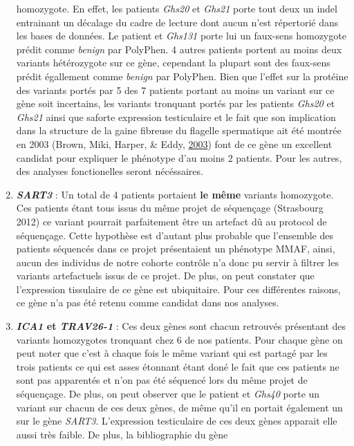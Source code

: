 \documentclass[12pt,twoside]{reedthesis}
\theoremstyle{definition}
\theoremstyle{definition}
\theoremstyle{remark}
\begin{document}
\begin{enumerate}
    homozygote. En effet, les patients \emph{Ghs20} et \emph{Ghs21} porte
    tout deux un indel entrainant un décalage du cadre de lecture dont
    aucun n'est répertorié dans les bases de données. Le patient et
    \emph{Ghs131} porte lui un faux-sens homozygote prédit comme
    \emph{benign} par PolyPhen. 4 autres patients portent au moins deux
    variants hétérozygote sur ce gène, cependant la plupart sont des
    faux-sens prédit égallement comme \emph{benign} par PolyPhen. Bien que
    l'effet sur la protéine des variants portés par 5 des 7 patients
    portant au moins un variant sur ce gène soit incertains, les variants
    tronquant portés par les patients \emph{Ghs20} et \emph{Ghs21} ainsi
    que saforte expression testiculaire et le fait que son implication
    dans la structure de la gaine fibreuse du flagelle spermatique ait été
    montrée en 2003 (Brown, Miki, Harper, \& Eddy,
    \protect\hyperlink{ref-Brown2003}{2003}) font de ce gène un excellent
    candidat pour expliquer le phénotype d'au moins 2 patients. Pour les
    autres, des analyses fonctionelles seront nécéssaires.
  \item
    \textbf{\emph{SART3}} : Un total de 4 patients portaient \textbf{le
    même} variants homozygote. Ces patients étant tous issus du même
    projet de séquençage (Strasbourg 2012) ce variant pourrait
    parfaitement être un artefact dû au protocol de séquençage. Cette
    hypothèse est d'autant plus probable que l'ensemble des patients
    séquencés dans ce projet présentaient un phénotype MMAF, ainsi, aucun
    des individus de notre cohorte contrôle n'a donc pu servir à filtrer
    les variants artefactuels issus de ce projet. De plus, on peut
    constater que l'expression tissulaire de ce gène est ubiquitaire. Pour
    ces différentes raisons, ce gène n'a pas été retenu comme candidat
    dans nos analyses.
  \item
    \textbf{\emph{ICA1} et \emph{TRAV26-1}} : Ces deux gènes sont chacun
    retrouvés présentant des variants homozygotes tronquant chez 6 de nos
    patients. Pour chaque gène on peut noter que c'est à chaque fois le
    même variant qui est partagé par les trois patients ce qui est asses
    étonnant étant doné le fait que ces patients ne sont pas apparentés et
    n'on pas été séquencé lors du même projet de séquençage. De plus, on
    peut observer que le patient et \emph{Ghs40} porte un variant sur
    chacun de ces deux gènes, de même qu'il en portait également un sur le
    gène \emph{SART3}. L'expression testiculaire de ces deux gènes
    apparait elle aussi très faible. De plus, la bibliographie du gène

\end{enumerate}
\end{document}

